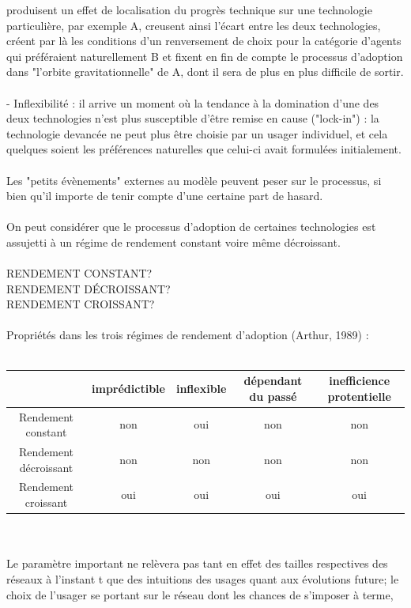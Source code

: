 \documentclass[a4paper, 10pt]{article}
\begin{document}
produisent un effet de localisation du progrès technique sur une technologie particulière, par exemple A,
creusent ainsi l'écart entre les deux technologies,
créent par là les conditions d'un renversement de choix pour la catégorie d'agents qui préféraient naturellement B et
fixent en fin de compte le processus d'adoption dans "l'orbite gravitationnelle" de A, dont il sera de plus en plus difficile de sortir.\\ \\
- Inflexibilité : il arrive un moment où la tendance à la domination d'une des deux technologies
n'est plus susceptible d'être remise en cause ("lock-in") :
la technologie devancée ne peut plus être choisie par un usager individuel,
et cela quelques soient les préférences naturelles que celui-ci avait formulées initialement.\\ \\
Les "petits évènements" externes au modèle peuvent peser sur le processus,
si bien qu'il importe de tenir compte d'une certaine part de hasard.\\ \\
On peut considérer que le processus d'adoption de certaines technologies est assujetti à
un régime de rendement constant voire même décroissant.\\ \\
RENDEMENT CONSTANT?\\
RENDEMENT DÉCROISSANT?\\
RENDEMENT CROISSANT?\\ \\
Propriétés dans les trois régimes de rendement d'adoption (Arthur, 1989) :\\ \\
\begin{tabular}{|c|c|c|c|c|}
\hline
& imprédictible & inflexible & dépendant du passé & inefficience protentielle \\
\hline
Rendement constant & non & oui & non & non\\
\hline
Rendement décroissant & non & non & non & non\\
\hline
Rendement croissant & oui & oui & oui & oui\\
\hline
\end{tabular}\\ \\
Le paramètre important ne relèvera pas tant en effet des tailles respectives des réseaux à l'instant t
que des intuitions des usages quant aux évolutions future;
le choix de l'usager se portant sur le réseau dont les chances de s'imposer à terme,
\end{document}
